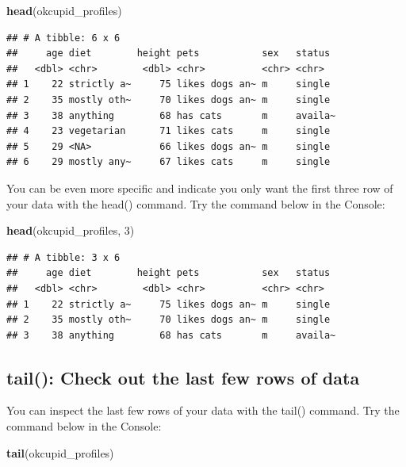 \documentclass[
]{krantz}
\makeatletter
\newenvironment{Shaded}{\begin{snugshade}}{\end{snugshade}}
\newcommand{\DecValTok}[1]{\textcolor[rgb]{0.06,0.06,0.06}{#1}}
\newcommand{\KeywordTok}[1]{\textcolor[rgb]{0.27,0.27,0.27}{\textbf{#1}}}
\newcommand{\NormalTok}[1]{#1}
\newenvironment{kframe}{%
\medskip{}
\setlength{\fboxsep}{.8em}
 \def\at@end@of@kframe{}%
 \ifinner\ifhmode%
  \def\at@end@of@kframe{\end{minipage}}%
  \begin{minipage}{\columnwidth}%
 \fi\fi%
 \def\FrameCommand##1{\hskip\@totalleftmargin \hskip-\fboxsep
 \colorbox{shadecolor}{##1}\hskip-\fboxsep
     \hskip-\linewidth \hskip-\@totalleftmargin \hskip\columnwidth}%
 \MakeFramed {\advance\hsize-\width
   \@totalleftmargin\z@ \linewidth\hsize
   \@setminipage}}%
 {\par\unskip\endMakeFramed%
 \at@end@of@kframe}
\renewenvironment{Shaded}{\begin{kframe}}{\end{kframe}}
\makeatother
\begin{document}
\begin{Shaded}
\begin{Highlighting}[]
\KeywordTok{head}\NormalTok{(okcupid_profiles)}
\end{Highlighting}
\end{Shaded}

\begin{verbatim}
## # A tibble: 6 x 6
##     age diet        height pets           sex   status 
##   <dbl> <chr>        <dbl> <chr>          <chr> <chr>  
## 1    22 strictly a~     75 likes dogs an~ m     single 
## 2    35 mostly oth~     70 likes dogs an~ m     single 
## 3    38 anything        68 has cats       m     availa~
## 4    23 vegetarian      71 likes cats     m     single 
## 5    29 <NA>            66 likes dogs an~ m     single 
## 6    29 mostly any~     67 likes cats     m     single
\end{verbatim}

You can be even more specific and indicate you only want the first three row of your data with the head() command. Try the command below in the Console:

\begin{Shaded}
\begin{Highlighting}[]
\KeywordTok{head}\NormalTok{(okcupid_profiles, }\DecValTok{3}\NormalTok{)}
\end{Highlighting}
\end{Shaded}

\begin{verbatim}
## # A tibble: 3 x 6
##     age diet        height pets           sex   status 
##   <dbl> <chr>        <dbl> <chr>          <chr> <chr>  
## 1    22 strictly a~     75 likes dogs an~ m     single 
## 2    35 mostly oth~     70 likes dogs an~ m     single 
## 3    38 anything        68 has cats       m     availa~
\end{verbatim}

\hypertarget{tail-check-out-the-last-few-rows-of-data}{%
\subsection{tail(): Check out the last few rows of data}\label{tail-check-out-the-last-few-rows-of-data}}

You can inspect the last few rows of your data with the tail() command. Try the command below in the Console:

\begin{Shaded}
\begin{Highlighting}[]
\KeywordTok{tail}\NormalTok{(okcupid_profiles)}
\end{Highlighting}
\end{Shaded}
\end{document}
